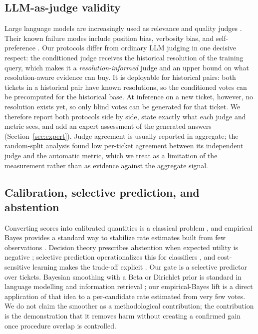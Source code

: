 \subsection{LLM-as-judge validity}
Large language models are increasingly used as relevance and quality judges
\cite{b11,b12,b35,b36}. Their known failure modes include position bias, verbosity
bias, and self-preference \cite{b13,b14}. Our protocols differ from ordinary LLM
judging in one decisive respect: the conditioned judge receives the historical
resolution of the training query, which makes it a \emph{resolution-informed}
judge and an upper bound on what resolution-aware evidence can buy. It is
deployable for historical pairs: both tickets in a historical pair have known
resolutions, so the conditioned votes can be precomputed for the historical base.
At inference on a new ticket, however, no resolution exists yet, so only blind
votes can be generated for that ticket. We therefore report both protocols side by side, state exactly
what each judge and metric sees, and add an expert assessment of the generated
answers (Section~\ref{sec:expert}). Judge agreement is usually reported in
aggregate; the random-split analysis found low per-ticket agreement between its
independent judge and the automatic metric, which we treat as a limitation of the
measurement rather than as evidence against the aggregate signal.

\subsection{Calibration, selective prediction, and abstention}
Converting scores into calibrated quantities is a classical problem
\cite{b15,b16,b17}, and empirical Bayes provides a standard way to stabilize rate
estimates built from few observations \cite{b18,b19,b38,b39}. Decision theory
prescribes abstention when expected utility is negative \cite{b20}; selective
prediction operationalizes this for classifiers \cite{b21}, and cost-sensitive
learning makes the trade-off explicit \cite{b22}. Our gate is a selective predictor
over tickets. Bayesian smoothing with a Beta or Dirichlet prior is standard in
language modelling and information retrieval \cite{b18,b19}; our empirical-Bayes
lift is a direct application of that idea to a per-candidate rate estimated from
very few votes. We do not claim the smoother as a methodological contribution; the
contribution is the demonstration that it removes harm without creating a confirmed
gain once procedure overlap is controlled.

